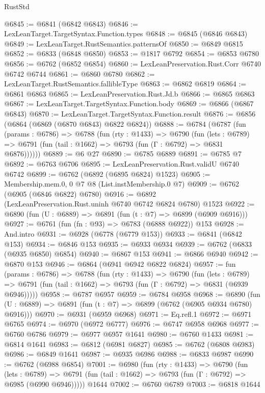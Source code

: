 \begin{lexlean}{RustStd}
\begin{coremodule}
{\begin{coremodule}
{{{{{{{{{{{{{{{{{{{{{{{{{{{{{{{{{{{{{{{{{{{{@6845 := @6841 (@6842 @6843)
@6846 := LexLeanTarget.TargetSyntax.Function.types
@6848 := @6845 (@6846 @6843)
@6849 := LexLeanTarget.RustSemantics.patternsOf
@6850 := @6849 @6815
@6852 := @6833 (@6848 @6850)
@6853 := @1817 @6792
@6854 := @6853 @6780
@6856 := @6762 (@6852 @6854)
@6860 := LexLeanPreservation.Rust.Corr @6740 @6742 @6744
@6861 := @6860 @6780
@6862 := LexLeanTarget.RustSemantics.fallibleType
@6863 := @6862 @6819
@6864 := @6861 @6863
@6865 := LexLeanPreservation.Rust.Jd.b
@6866 := @6865 @6863
@6867 := LexLeanTarget.TargetSyntax.Function.body
@6869 := @6866 (@6867 @6843)
@6870 := LexLeanTarget.TargetSyntax.Function.result
@6876 := @6856 (@6864 (@6869 (@6870 @6843) @6822 @6824))
@6888 := @6784
    (@6787
      (fun (params : @6786) =>
      @6788
        (fun (rty : @1433) =>
        @6790
          (fun (lets : @6789) =>
          @6791 (fun (tail : @1662) => @6793 (fun (Γ : @6792) => @6831 @6876))))))
@6889 := @6 @27
@6890 := @6785 @6889
@6891 := @6785 @7
@6892 := @6763 @6706
@6895 := LexLeanPreservation.Rust.validU @6740 @6742
@6899 := @6762 (@6892 (@6895 @6824) @1523)
@6905 := Membership.mem.{0, 0} @7 @8 (List.instMembership.{0} @7)
@6909 := @6762 (@6905 (@6846 @6822) @6780)
@6916 := @6892 (LexLeanPreservation.Rust.uninh @6740 @6742 @6824 @6780) @1523
@6922 := @6890 (fun (U : @6889) => @6891 (fun (t : @7) => @6899 (@6909 @6916)))
@6927 := @6761 (fun (fn : @93) => @6783 (@6888 @6922)) @153
@6928 := And.intro
@6931 := @6928 (@6778 (@6779 @153))
@6933 := @6841 (@6842 @153)
@6934 := @6846 @153
@6935 := @6933 @6934
@6939 := @6762 (@6833 (@6935 @6850) @6854)
@6940 := @6867 @153
@6941 := @6866 @6940
@6942 := @6870 @153
@6946 := @6864 (@6941 @6942 @6822 @6824)
@6957 := fun (params : @6786) =>
  @6788
    (fun (rty : @1433) =>
    @6790
      (fun (lets : @6789) =>
      @6791 (fun (tail : @1662) => @6793 (fun (Γ : @6792) => @6831 (@6939 @6946)))))
@6958 := @6787 @6957
@6959 := @6784 @6958
@6968 := @6890 (fun (U : @6889) => @6891 (fun (t : @7) => @6899 (@6762 (@6905 @6934 @6780) @6916)))
@6970 := @6931 (@6959 @6968)
@6971 := Eq.refl.{1}
@6972 := @6971 @6765
@6974 := @6970 (@6972 @6777)
@6976 := @6747 @6958 @6968
@6977 := @6760 @6786
@6979 := @6977 @6957 @1641
@6980 := @6760 @1433
@6981 := @6814 @1641
@6983 := @6812 (@6981 @6827)
@6985 := @6762 (@6808 @6983)
@6986 := @6849 @1641
@6987 := @6935 @6986
@6988 := @6833 @6987
@6990 := @6762 (@6988 @6854)
@7001 := @6980
    (fun (rty : @1433) =>
    @6790
      (fun (lets : @6789) =>
      @6791 (fun (tail : @1662) => @6793 (fun (Γ : @6792) => @6985 (@6990 @6946)))))
    @1644
@7002 := @6760 @6789
@7003 := @6818 @1644
}}}}}}}}}}}}}}}}}}}}}}}}}}}}}}}}}}}}}}}}}}}}
\end{coremodule}}
\end{coremodule}
\end{lexlean}
